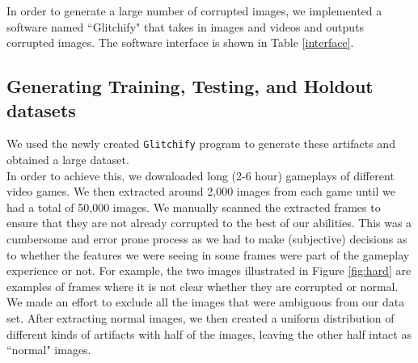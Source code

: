 \noindent In order to generate a large number of corrupted images, we implemented a software named ``Glitchify" that takes in images and videos and outputs corrupted images. The software interface is shown in Table \ref{interface}.
\begin{center}
\begin{table}
\caption{\label{interface}Interface of the \textit{Glitchify} software.}
\end{table}
\end{center}
\subsection*{Generating Training, Testing, and Holdout datasets}

\noindent We used the newly created \texttt{Glitchify} program to generate these artifacts and obtained a large dataset. \\


\noindent In order to achieve this, we downloaded long (2-6 hour) gameplays of different video games. We then extracted around 2,000 images from each game until we had a total of 50,000 images. We manually scanned the extracted frames to ensure that they are not already corrupted to the best of our abilities. This was a cumbersome and error prone process as we had to make (subjective) decisions as to whether the features we were seeing in some frames were part of the gameplay experience or not. For example, the two images illustrated in Figure \ref{fig:hard} are examples of frames where it is not clear whether they are corrupted or normal. We made an effort to exclude all the images that were ambiguous from our data set. After extracting normal images, we then created a uniform distribution of different kinds of artifacts with half of the images, leaving the other half intact as ``normal" images. \\


